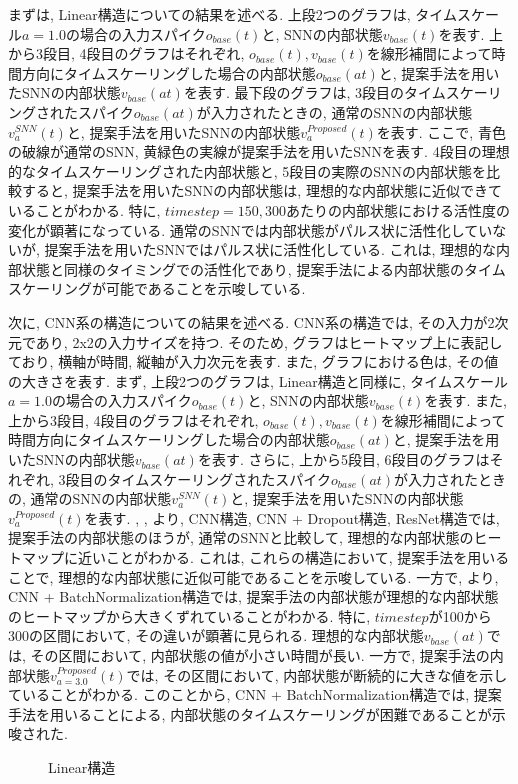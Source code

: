 まずは, Linear構造についての結果を述べる.
上段2つのグラフは, タイムスケール$a=1.0$の場合の入力スパイク$o_{base}(t)$と, SNNの内部状態$v_{base}(t)$を表す.
上から3段目, 4段目のグラフはそれぞれ, $o_{base}(t), v_{base}(t)$を線形補間によって時間方向にタイムスケーリングした場合の内部状態$o_{base}(at)$と, 提案手法を用いたSNNの内部状態$v_{base}(at)$を表す.
最下段のグラフは, 3段目のタイムスケーリングされたスパイク$o_{base}(at)$が入力されたときの, 通常のSNNの内部状態$v_a^{SNN}(t)$と, 提案手法を用いたSNNの内部状態$v_a^{Proposed}(t)$を表す.
ここで, 青色の破線が通常のSNN, 黄緑色の実線が提案手法を用いたSNNを表す.
4段目の理想的なタイムスケーリングされた内部状態と, 5段目の実際のSNNの内部状態を比較すると, 提案手法を用いたSNNの内部状態は, 理想的な内部状態に近似できていることがわかる.
特に, $timestep=150, 300$あたりの内部状態における活性度の変化が顕著になっている.
通常のSNNでは内部状態がパルス状に活性化していないが, 提案手法を用いたSNNではパルス状に活性化している.
これは, 理想的な内部状態と同様のタイミングでの活性化であり, 提案手法による内部状態のタイムスケーリングが可能であることを示唆している.

次に, CNN系の構造についての結果を述べる.
CNN系の構造では, その入力が2次元であり, 2x2の入力サイズを持つ.
そのため, グラフはヒートマップ上に表記しており, 横軸が時間, 縦軸が入力次元を表す.
また, グラフにおける色は, その値の大きさを表す.
まず, 上段2つのグラフは, Linear構造と同様に, タイムスケール$a=1.0$の場合の入力スパイク$o_{base}(t)$と, SNNの内部状態$v_{base}(t)$を表す.
また, 上から3段目, 4段目のグラフはそれぞれ, $o_{base}(t), v_{base}(t)$を線形補間によって時間方向にタイムスケーリングした場合の内部状態$o_{base}(at)$と, 提案手法を用いたSNNの内部状態$v_{base}(at)$を表す.
さらに, 上から5段目, 6段目のグラフはそれぞれ, 3段目のタイムスケーリングされたスパイク$o_{base}(at)$が入力されたときの, 通常のSNNの内部状態$v_a^{SNN}(t)$と, 提案手法を用いたSNNの内部状態$v_a^{Proposed}(t)$を表す.
, , より, CNN構造, CNN + Dropout構造, ResNet構造では, 提案手法の内部状態のほうが, 通常のSNNと比較して, 理想的な内部状態のヒートマップに近いことがわかる.
これは, これらの構造において, 提案手法を用いることで, 理想的な内部状態に近似可能であることを示唆している.
一方で, より, CNN + BatchNormalization構造では, 提案手法の内部状態が理想的な内部状態のヒートマップから大きくずれていることがわかる.
特に, $timestep$が100から300の区間において, その違いが顕著に見られる.
理想的な内部状態$v_{base}(at)$では, その区間において, 内部状態の値が小さい時間が長い.
一方で, 提案手法の内部状態$v_{a=3.0}^{Proposed}(t)$では, その区間において, 内部状態が断続的に大きな値を示していることがわかる.
このことから, CNN + BatchNormalization構造では, 提案手法を用いることによる, 内部状態のタイムスケーリングが困難であることが示唆された.
\begin{figure}[htb]
    \centering
    
    \caption{Linear構造}
    \label{fig:result1:2:linear}
\end{figure}

